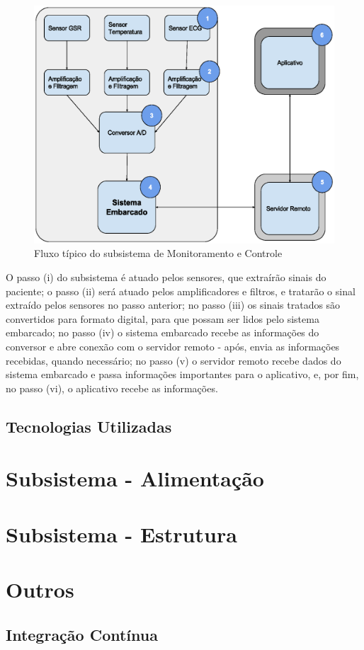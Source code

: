 \begin{figure}[H]
  \centering
    \includegraphics[width=\textwidth]{figuras/arquitetura-monitoramentoecontrole.eps}
  \caption{Fluxo típico do subsistema de Monitoramento e Controle}
  \label{fig:arquitetura-monitoramento-e-controle}
\end{figure}

O passo (i) do subsistema é atuado pelos sensores, que extraírão sinais do paciente;
o passo (ii) será atuado pelos amplificadores e filtros, e tratarão o sinal
extraído pelos sensores no passo anterior; no passo (iii) os sinais tratados
são convertidos para formato digital, para que possam ser lidos pelo sistema
embarcado; no passo (iv) o sistema embarcado recebe as informações do conversor
e abre conexão com o servidor remoto - após, envia as informações recebidas,
quando necessário; no passo (v) o servidor remoto recebe dados do sistema
embarcado e passa informações importantes para o aplicativo, e, por fim,
no passo (vi), o aplicativo recebe as informações.

\subsection{Tecnologias Utilizadas}

\section{Subsistema - Alimentação}

\section{Subsistema - Estrutura}

\section{Outros}

\subsection{Integração Contínua}
